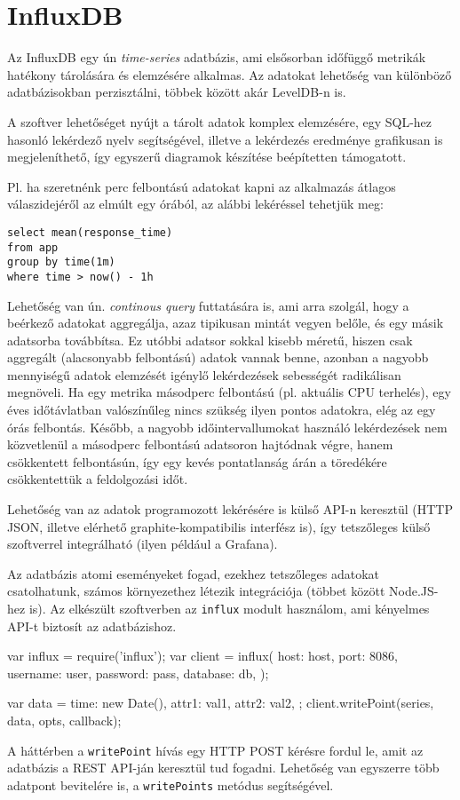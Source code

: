 \section{InfluxDB}

Az InfluxDB egy ún \emph{time-series} adatbázis, ami elsősorban időfüggő
metrikák hatékony tárolására és elemzésére alkalmas\cite{InfluxDB}.
Az adatokat lehetőség van különböző adatbázisokban perzisztálni,
többek között akár LevelDB-n is.

A szoftver lehetőséget nyújt a tárolt adatok komplex elemzésére, egy SQL-hez
hasonló lekérdező nyelv segítségével, illetve a lekérdezés eredménye grafikusan
is megjeleníthető, így egyszerű diagramok készítése beépítetten támogatott.

Pl. ha szeretnénk perc felbontású adatokat kapni az alkalmazás átlagos
válaszidejéről az elmúlt egy órából, az alábbi lekéréssel tehetjük meg:

\begin{verbatim}
select mean(response_time)
from app
group by time(1m)
where time > now() - 1h
\end{verbatim}

Lehetőség van ún. \emph{continous query} futtatására is, ami arra szolgál,
hogy a beérkező adatokat aggregálja, azaz tipikusan mintát vegyen belőle,
és egy másik adatsorba továbbítsa. Ez utóbbi adatsor sokkal kisebb méretű,
hiszen csak aggregált (alacsonyabb felbontású) adatok vannak benne,
azonban a nagyobb mennyiségű adatok elemzését igénylő lekérdezések sebességét
radikálisan megnöveli. Ha egy metrika másodperc felbontású (pl. aktuális
CPU terhelés), egy éves időtávlatban valószínűleg nincs szükség ilyen
pontos adatokra, elég az egy órás felbontás.
Később, a nagyobb időintervallumokat használó lekérdezések nem közvetlenül
a másodperc felbontású adatsoron hajtódnak végre, hanem csökkentett
felbontásún, így egy kevés pontatlanság árán a töredékére csökkentettük
a feldolgozási időt.

Lehetőség van az adatok programozott lekérésére is külső API-n keresztül
(HTTP JSON, illetve elérhető graphite-kompatibilis interfész is), így
tetszőleges külső szoftverrel integrálható (ilyen például a Grafana).

Az adatbázis atomi eseményeket fogad, ezekhez tetszőleges adatokat csatolhatunk,
számos környezethez létezik integrációja (többet között Node.JS-hez is).
Az elkészült szoftverben az \verb=influx= modult használom, ami kényelmes
API-t biztosít az adatbázishoz.

\begin{js}
  var influx = require('influx');
  var client = influx({
    host: host,
    port: 8086,
    username: user,
    password: pass,
    database: db,
  });

  var data = {
    time: new Date(),
    attr1: val1,
    attr2: val2,
  };
  client.writePoint(series, data, opts, callback);
\end{js}

A háttérben a \verb=writePoint= hívás egy HTTP POST kérésre fordul le,
amit az adatbázis a REST API-ján keresztül tud fogadni.
Lehetőség van egyszerre több adatpont bevitelére is, a \verb=writePoints=
metódus segítségével.
